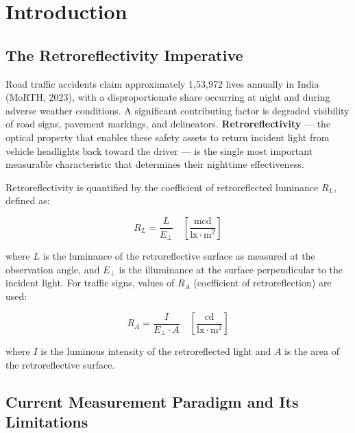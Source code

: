 \documentclass[11pt,a4paper]{article}
\begin{document}
\newpage
\tableofcontents
\newpage

\section{Introduction}

\subsection{The Retroreflectivity Imperative}

Road traffic accidents claim approximately 1,53,972 lives annually in India (MoRTH, 2023), with a disproportionate share occurring at night and during adverse weather conditions. A significant contributing factor is degraded visibility of road signs, pavement markings, and delineators. \textbf{Retroreflectivity} --- the optical property that enables these safety assets to return incident light from vehicle headlights back toward the driver --- is the single most important measurable characteristic that determines their nighttime effectiveness.

Retroreflectivity is quantified by the coefficient of retroreflected luminance $R_L$, defined as:

\begin{equation}
R_L = \frac{L}{E_\perp} \quad \left[\frac{\text{mcd}}{\text{lx} \cdot \text{m}^2}\right]
\label{eq:rl_definition}
\end{equation}

where $L$ is the luminance of the retroreflective surface as measured at the observation angle, and $E_\perp$ is the illuminance at the surface perpendicular to the incident light. For traffic signs, values of $R_A$ (coefficient of retroreflection) are used:

\begin{equation}
R_A = \frac{I}{E_\perp \cdot A} \quad \left[\frac{\text{cd}}{\text{lx} \cdot \text{m}^2}\right]
\label{eq:ra_definition}
\end{equation}

where $I$ is the luminous intensity of the retroreflected light and $A$ is the area of the retroreflective surface.

\subsection{Current Measurement Paradigm and Its Limitations}
\end{document}
